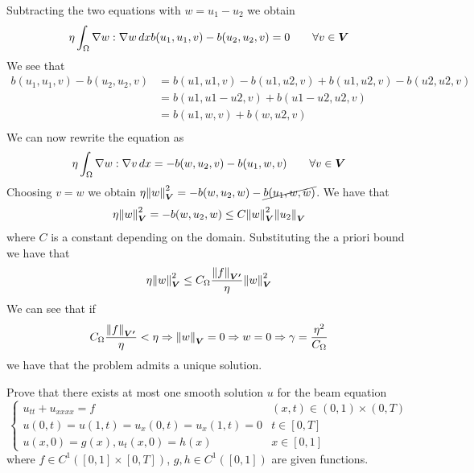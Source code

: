 \begin{enumerate}
    Subtracting the two equations with \(w = u_1 - u_2\) we obtain
    \[
        \begin{split}
            \eta \int_\Omega \nabla w : \nabla w \, dx b(u_1, u_1, v) - b(u_2, u_2, v) = 0 \qquad \forall v \in \bm{V}
        \end{split}
    \]
    We see that 
    \begin{align*}
        b(u_1, u_1, v) - b(u_2, u_2, v) &= b(u1, u1, v) - b(u1, u2, v) + b(u1, u2, v) - b(u2, u2, v) \\
        &= b(u1, u1 - u2, v) + b(u1 - u2, u2, v) \\
        &= b(u1, w, v) + b(w, u2, v) \\
    \end{align*}
    We can now rewrite the equation as
    \[
        \begin{split}
            \eta \int_\Omega \nabla w : \nabla v \, dx= -b(w, u_2, v) - b(u_1, w, v) \qquad \forall v \in \bm{V}
        \end{split}
    \]
    Choosing \(v = w\) we obtain \(\eta \norm{w}_{\bm{V}}^2 = -b(w, u_2, w) - \cancel{b(u_1, w, w)}\). We have that
    \[
        \begin{split}
            \eta \norm{w}_{\bm{V}}^2 = -b(w, u_2, w) \leq C \norm{w}_{\bm{V}}^2 \norm{u_2}_{\bm{V}}
        \end{split}
    \]
    where \(C\) is a constant depending on the domain. Substituting the a priori bound we have that
    \[
        \begin{split}
             \eta \norm{w}_{\bm{V}}^2 \leq C_\Omega \frac{\norm{f}_{\bm{V'}}}{\eta} \norm{w}_{\bm{V}}^2
        \end{split}
    \]
    We can see that if
    \[
        \begin{split}
            C_\Omega \frac{\norm{f}_{\bm{V'}}}{\eta} < \eta \Rightarrow \norm{w}_{\bm{V}} = 0 \Rightarrow w = 0 \Rightarrow \gamma = \frac{\eta^2}{C_\Omega} 
        \end{split}
    \]
    we have that the problem admits a unique solution. 
\end{enumerate}

\newpage
\begin{exercise}
    Prove that there exists at most one smooth solution \(u\) for the beam equation
    \[
        \begin{cases}
            u_{tt} + u_{xxxx} = f & (x,t) \in (0,1) \times (0, T) \\
            u(0, t) = u(1, t) = u_x(0, t) = u_x(1, t) = 0 & t \in [0, T] \\
            u(x, 0) = g(x), u_t(x, 0) = h(x) & x \in [0, 1]
        \end{cases}
        \tag*{(P)}
    \]
    where \(f \in C^1([0,1] \times [0, T])\), \(g, h \in C^1([0,1])\) are given functions.
\end{exercise}

